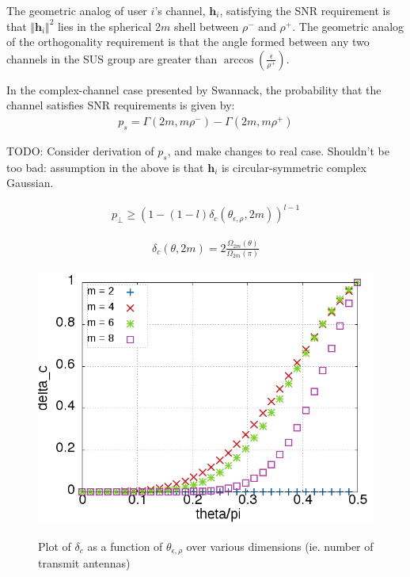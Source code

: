 The geometric analog of user $i$'s channel, $\textbf{h}_i$, satisfying the SNR requirement is that $\Vert\textbf{h}_i\Vert^2$ lies in the spherical 2$m$ shell between $\rho^-$ and $\rho^+$. The geometric analog of the orthogonality requirement is that the angle formed between any two channels in the SUS group are greater than $\arccos{(\frac{\epsilon}{\rho^+})}$.

In the complex-channel case presented by Swannack, the probability that the channel satisfies SNR requirements is given by:
\begin{equation}\label{eq:p_s}
    \begin{aligned}
        p_s = \Gamma(2m,m\rho^-) - \Gamma(2m,m\rho^+)
    \end{aligned}
\end{equation}

TODO: Consider derivation of $p_s$, and make changes to real case. Shouldn't be too bad: assumption in the above is that $\textbf{h}_i$ is circular-symmetric complex Gaussian.

\begin{equation}\label{eq:p_perp}
    \begin{aligned}
        p_\perp \geq (1-(1-l)\delta_c(\theta_{\epsilon,\rho},2m))^{l-1}
    \end{aligned}
\end{equation}

\begin{equation}\label{eq:delta_c_sphere}
    \begin{aligned}
        \delta_c(\theta,2m) = 2\frac{\Omega_{2m}(\theta)}{\Omega_{2m}(\pi)}
    \end{aligned}
\end{equation}

\begin{figure}
    \includegraphics[width=12cm]{figs/delta.png}\\
    \caption{Plot of $\delta_c$ as a function of $\theta_{\epsilon,\rho}$ over various dimensions (ie. number of transmit antennas)}
    \label{fig:delta}
\end{figure}


